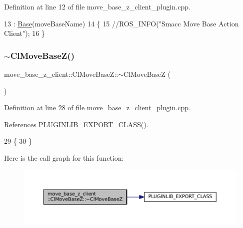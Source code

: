 Definition at line 12 of file move\+\_\+base\+\_\+z\+\_\+client\+\_\+plugin.\+cpp.


\begin{DoxyCode}
13  : \hyperlink{classmove__base__z__client_1_1ClMoveBaseZ_a5446f4fb56caf7c8de8dd3bd34ae64d6}{Base}(moveBaseName)
14 \{
15     \textcolor{comment}{//ROS\_INFO("Smacc Move Base Action Client");}
16 \}
\end{DoxyCode}
\mbox{\label{classmove__base__z__client_1_1ClMoveBaseZ_ab5de84b969e58d80723f5c0d3ce79afa}} 
\subsubsection{\texorpdfstring{$\sim$\+Cl\+Move\+Base\+Z()}{~ClMoveBaseZ()}}
{\footnotesize\ttfamily move\+\_\+base\+\_\+z\+\_\+client\+::\+Cl\+Move\+Base\+Z\+::$\sim$\+Cl\+Move\+BaseZ (\begin{DoxyParamCaption}{ }\end{DoxyParamCaption})\hspace{0.3cm}{\ttfamily [virtual]}}



Definition at line 28 of file move\+\_\+base\+\_\+z\+\_\+client\+\_\+plugin.\+cpp.



References P\+L\+U\+G\+I\+N\+L\+I\+B\+\_\+\+E\+X\+P\+O\+R\+T\+\_\+\+C\+L\+A\+S\+S().


\begin{DoxyCode}
29 \{
30 \}
\end{DoxyCode}
Here is the call graph for this function\+:
\nopagebreak
\begin{figure}[H]
\begin{center}
\leavevmode
\includegraphics[width=350pt]{classmove__base__z__client_1_1ClMoveBaseZ_ab5de84b969e58d80723f5c0d3ce79afa_cgraph}
\end{center}
\end{figure}


